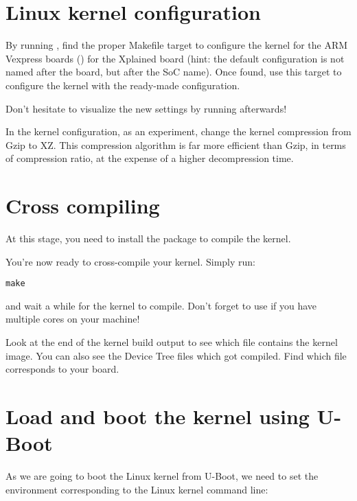 \section{Linux kernel configuration}

By running , find the proper Makefile target to
configure the kernel
{for the ARM Vexpress boards ()}
{for the Xplained board (hint: the default
configuration is not named after the board, but after the SoC
name). Once found, use this target to configure the kernel with the
ready-made configuration.}

Don't hesitate to visualize the new settings by running
 afterwards!

In the kernel configuration, as an experiment, change the kernel
compression from Gzip to XZ. This compression algorithm is far more
efficient than Gzip, in terms of compression ratio, at the expense of
a higher decompression time.

\section{Cross compiling}

At this stage, you need to install the 
package to compile the kernel.

You're now ready to cross-compile your kernel. Simply run:

\begin{verbatim}
make
\end{verbatim}

and wait a while for the kernel to compile. Don't forget to use
 if you have multiple cores on your machine!

Look at the end of the kernel build output to see which file contains
the kernel image. You can also see the Device Tree  files
which got compiled. Find which  file corresponds to your
board.

\section{Load and boot the kernel using U-Boot}

As we are going to boot the Linux kernel from U-Boot,
we need to set the  environment corresponding
to the Linux kernel command line:

{}
{}

